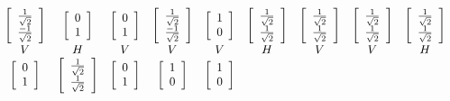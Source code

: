 \begin{displaymath}
\begin{array}{ccccccccc}
	\left[\begin{array}{c}\frac{1}{\sqrt{2}}\\ \frac{-1}{\sqrt{2}}\end{array}\right] &
	\left[\begin{array}{c}0\\1\end{array}\right] &
	\left[\begin{array}{c}0\\1\end{array}\right] &
	\left[\begin{array}{c}\frac{1}{\sqrt{2}}\\ \frac{-1}{\sqrt{2}}\end{array}\right] &
	\left[\begin{array}{c}1\\0\end{array}\right] &
	\left[\begin{array}{c}\frac{1}{\sqrt{2}}\\ \frac{1}{\sqrt{2}}\end{array}\right] &
	\left[\begin{array}{c}\frac{1}{\sqrt{2}}\\ \frac{1}{\sqrt{2}}\end{array}\right] &
	\left[\begin{array}{c}\frac{1}{\sqrt{2}}\\ \frac{1}{\sqrt{2}}\end{array}\right] &
	\left[\begin{array}{c}\frac{1}{\sqrt{2}}\\ \frac{1}{\sqrt{2}}\end{array}\right]  \\
	V&H&V&V&V&H&V&V&H \\
	\left[\begin{array}{c}0\\1\end{array}\right]&
	\left[\begin{array}{c}\frac{1}{\sqrt{2}}\\ \frac{1}{\sqrt{2}}\end{array}\right]&
	\left[\begin{array}{c}0\\1\end{array}\right] &
	\left[\begin{array}{c}1\\0\end{array}\right]&
	\left[\begin{array}{c}1\\0\end{array}\right] &

\end{array}
\end{displaymath}
